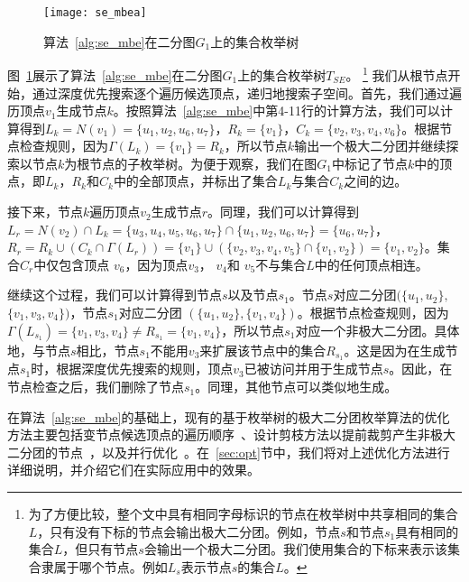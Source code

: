 \begin{figure} [ht]
  \vspace{0.1 in}
  \centering
  \texttt{[image: se\_mbea]}
  \vspace{0.1 in}
  \caption{算法~\ref{alg:se_mbe}在二分图$G_1$上的集合枚举树}
  \label{fig:se_mbea}
\end{figure}

\begin{example}
  \label{example:se}
  图~\ref{fig:se_mbea}展示了算法~\ref{alg:se_mbe}在二分图$G_1$上的集合枚举树$T_{SE}$。
  \footnote{为了方便比较，整个文中具有相同字母标识的节点在枚举树中共享相同的集合$L$，只有没有下标的节点会输出极大二分团。例如，节点$s$和节点$s_1$具有相同的集合$L$，但只有节点$s$会输出一个极大二分团。我们使用集合的下标来表示该集合隶属于哪个节点。例如$L_s$表示节点$s$的集合$L$。 
}
我们从根节点开始，通过深度优先搜索逐个遍历候选顶点，递归地搜索子空间。首先，我们通过遍历顶点$v_1$生成节点$k$。按照算法~\ref{alg:se_mbe}中第4-11行的计算方法，我们可以计算得到$L_k=N(v_1)=\{u_1, u_2, u_6, u_7\}$，$R_k=\{v_1\}$，$C_k=\{v_2,v_3,v_4,v_6\}$。根据节点检查规则，因为$\Gamma(L_{k}) = \{v_1\} = R_{k}$，所以节点$k$输出一个极大二分团并继续探索以节点$k$为根节点的子枚举树。为便于观察，我们在图$G_1$中标记了节点$k$中的顶点，即$L_k$，$R_k$和$C_k$中的全部顶点，并标出了集合$L_k$与集合$C_k$之间的边。

接下来，节点$k$遍历顶点$v_2$生成节点$r$。同理，我们可以计算得到$L_{r} = N(v_2) \cap L_{k} 
= \{u_3, u_4, u_5, u_6, u_7\} \cap \{u_1, u_2, u_6, u_7\} = \{u_6, u_7\}$， $R_{r} = R_{k} \cup (C_{k} \cap \Gamma(L_{r})) = \{v_1\} \cup (\{v_2, v_3, v_4, v_5\} \cap \{v_1, v_2\}) = \{v_1, v_2\}$。集合$C_{r}$中仅包含顶点 $v_6$，因为顶点$v_3$， $v_4$和 $v_5$不与集合$L$中的任何顶点相连。

继续这个过程，我们可以计算得到节点$s$以及节点$s_1$。节点$s$对应二分团$(\{u_1, u_2\},$ $\{v_1, v_3, v_4\})$，节点$s_1$对应二分团 $(\{u_1, u_2\}, \{v_1, v_4\})$。根据节点检查规则，因为$\Gamma(L_{s_1}) = \{v_1, v_3, v_4\} \neq R_{s_1} = \{v_1, v_4\}$，所以节点$s_1$对应一个非极大二分团。具体地，与节点$s$相比，节点$s_1$不能用$v_3$来扩展该节点中的集合$R_{s_1}$。这是因为在生成节点$s_1$时，根据深度优先搜索的规则，顶点$v_3$已被访问并用于生成节点$s$。因此，在节点检查之后，我们删除了节点$s_1$。同理，其他节点可以类似地生成。

\end{example}

在算法~\ref{alg:se_mbe}的基础上，现有的基于枚举树的极大二分团枚举算法的优化方法主要包括变节点候选顶点的遍历顺序~\cite{minel06,iMBEA14,PMBE20,ooMBE22}、设计剪枝方法以提前裁剪产生非极大二分团的节点~\cite{iMBEA14,PMBE20,ooMBE22}，以及并行优化~\cite{mapreduceMBE16,parMBE19}。在~\ref{sec:opt}节中，我们将对上述优化方法进行详细说明，并介绍它们在实际应用中的效果。


